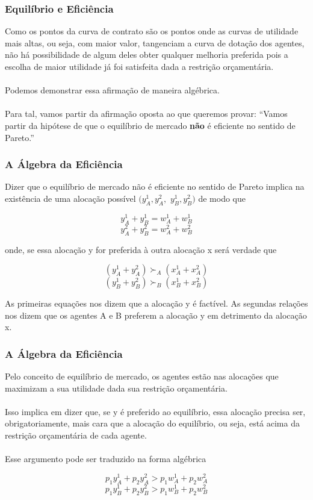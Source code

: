 \documentclass{beamer}[10]
\begin{document}
\begin{frame}
	\frametitle{Equilíbrio e Eficiência}

	Como os pontos da curva de contrato são os pontos onde as curvas de utilidade mais altas, ou seja, com maior valor, tangenciam a curva de dotação dos agentes, não há possibilidade de algum deles obter qualquer melhoria preferida pois a escolha de maior utilidade já foi satisfeita dada a restrição orçamentária.
	\\~\\
	Podemos demonstrar essa afirmação de maneira algébrica.
	\\~\\
	Para tal, vamos partir da afirmação oposta ao que queremos provar: ``Vamos partir da hipótese de que o equilíbrio de mercado \textbf{não} é eficiente no sentido de Pareto.''

\end{frame}

\begin{frame}
	\frametitle{A Álgebra da Eficiência}

	Dizer que o equilíbrio de mercado não é eficiente no sentido de Pareto implica na existência de uma alocação possível $(y_A^1,y_A^2,$ $y_B^1,y_B^2)$ de modo que

	$$y_A^1 + y_B^1 = w_A^1 + w_ B^1$$
	$$y_A^2 + y_B^2 = w_A^2 + w_ B^2$$

	onde, se essa alocação y for preferida à outra alocação x será verdade que

	$$(y_A^1 + y_A^2) \succ_A (x_A^1 + x_A^2)$$
	$$(y_B^1 + y_B^2) \succ_B (x_B^1 + x_B^2)$$

	As primeiras equações nos dizem que a alocação y é factível. As segundas relações nos dizem que os agentes A e B preferem a alocação y em detrimento da alocação x.

\end{frame}

\begin{frame}
	\frametitle{A Álgebra da Eficiência}

	Pelo conceito de equilíbrio de mercado, os agentes estão nas alocações que maximizam a sua utilidade dada sua restrição orçamentária.
	\\~\\
	Isso implica em dizer que, se y é preferido ao equilíbrio, essa alocação precisa ser, obrigatoriamente, mais cara que a alocação do equilíbrio, ou seja, está acima da restrição orçamentária de cada agente.
	\\~\\
	Esse argumento pode ser traduzido na forma algébrica

	$$p_1y_A^1 + p_2y_A^2 > p_1w_A^1 + p_2w_A^2$$
	$$p_1y_B^1 + p_2y_B^2 > p_1w_B^1 + p_2w_B^2$$

\end{frame}
\end{document}
